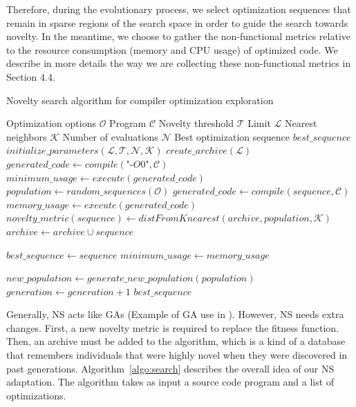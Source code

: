 Therefore, during the evolutionary process, we select optimization sequences that remain in sparse regions of the search space in order to guide the search towards novelty. 
In the meantime, we choose to gather the non-functional metrics relative to the resource consumption (memory and CPU usage) of optimized code. 
We describe in more details the way we are collecting these non-functional metrics in Section 4.4.

\begin{algorithm}
	\footnotesize
	\caption{Novelty search algorithm for compiler optimization exploration}
	\label{algo:search}
	\begin{algorithmic}[1]
		
		\REQUIRE Optimization options $\mathcal{O}$
		\REQUIRE Program $\mathcal{C}$
		\REQUIRE Novelty threshold $\mathcal{T}$
		\REQUIRE Limit $\mathcal{L}$
		\REQUIRE Nearest neighbors $\mathcal{K}$
		\REQUIRE Number of evaluations $\mathcal{N}$
		\ENSURE Best optimization sequence $best\_sequence$
		\STATE $initialize\_parameters(\mathcal{L},\mathcal{T},\mathcal{N},\mathcal{K})$
		\STATE $create\_archive(\mathcal{L})$
		\STATE 	$generated\_code \gets compile(\textit{"-O0"},\mathcal{C})$
		\STATE 	$minimum\_usage \gets execute(generated\_code)$
		\STATE $population \gets random\_sequences(\mathcal{O})$
		\REPEAT
		\STATE 	$generated\_code \gets compile(sequence,\mathcal{C})$
		\STATE 	$memory\_usage \gets execute(generated\_code)$
		\STATE	$novelty\_metric(sequence) \gets distFromKnearest(archive,population,\mathcal{K})$
		\STATE	$archive \gets archive \cup sequence$
		\ENDIF
		
		\STATE	$best\_sequence \gets sequence$
		\STATE	$minimum\_usage \gets memory\_usage$
		\ENDIF
		
		\ENDFOR
		\STATE		$new\_population \gets generate\_new\_population(population)$
		\STATE		$generation \gets generation + 1$
		\RETURN $best\_sequence$
	\end{algorithmic}
\end{algorithm}

Generally, NS acts like GAs (Example of GA use in  \cite{cooper2002adaptive}). However, NS needs extra changes. First, a new novelty metric is required to replace the fitness function. Then, an archive must be added to the algorithm, which is a kind of a database that remembers individuals that were highly novel when they were discovered in past generations. 
Algorithm~\ref{algo:search} describes the overall idea of our NS adaptation. The algorithm takes as input a source code program and a list of optimizations. 

